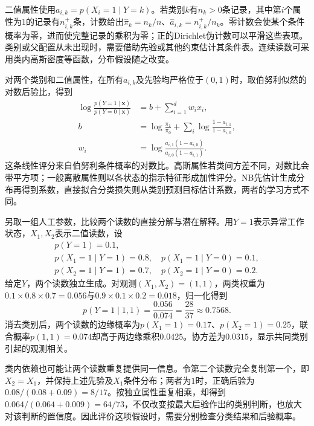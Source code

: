 二值属性使用$a_{i,k}=p(X_i=1\mid Y=k)$。若类别$k$有$n_k>0$条记录，其中第$i$个属性为$1$的记录有$n_{i,k}^{+}$条，计数给出$\widehat\pi_k=n_k/n$、$\widehat a_{i,k}=n_{i,k}^{+}/n_k$。零计数会使某个条件概率为零，进而使完整记录的乘积为零；正的Dirichlet伪计数可以平滑这些表项。类别或父配置从未出现时，需要借助先验或其他约束估计其条件表。连续读数可采用类内高斯密度等函数，分布假设随之改变。

对两个类别和二值属性，在所有$a_{i,k}$及先验均严格位于$(0,1)$时，取伯努利似然的对数后验比，得到
\begin{equation}
  \label{eq:pgm-static-directed-naive-boundary}
  \begin{aligned}
  \log\frac{p(Y=1\mid\bm{x})}{p(Y=0\mid\bm{x})}
    &=b+\sum_{i=1}^{d}w_i x_i,\\
  b&=\log\frac{\pi_1}{\pi_0}
       +\sum_i\log\frac{1-a_{i,1}}{1-a_{i,0}},\\
  w_i&=\log\frac{a_{i,1}(1-a_{i,0})}
                       {a_{i,0}(1-a_{i,1})}.
  \end{aligned}
\end{equation}
这条线性评分来自伯努利条件概率的对数比。高斯属性若类间方差不同，对数比会带平方项；一般离散属性则以各状态的指示特征形成加性评分。NB先估计生成分布再得到系数，直接拟合分类损失则从类别预测目标估计系数，两者的学习方式不同。

\begin{example}[两个二值读数]
  \label{ex:pgm-static-directed-binary}
  另取一组人工参数，比较两个读数的直接分解与潜在解释。用$Y=1$表示异常工作状态，$X_1,X_2$表示二值读数，设
  \[
  \begin{gathered}
    p(Y=1)=0.1,\\
    p(X_1=1\mid Y=1)=0.8,\quad
    p(X_1=1\mid Y=0)=0.1,\\
    p(X_2=1\mid Y=1)=0.7,\quad
    p(X_2=1\mid Y=0)=0.2.
  \end{gathered}
  \]
  给定$Y$，两个读数独立生成。对观测$(X_1,X_2)=(1,1)$，两类权重为$0.1\times0.8\times0.7=0.056$与$0.9\times0.1\times0.2=0.018$，归一化得到
  \[
    p(Y=1\mid1,1)=\frac{0.056}{0.074}
      =\frac{28}{37}\approx0.7568.
  \]
  消去类别后，两个读数的边缘概率为$p(X_1=1)=0.17$、$p(X_2=1)=0.25$，联合概率$p(1,1)=0.074$却高于两边缘乘积$0.0425$。协方差为$0.0315$，显示共同类别引起的观测相关。
\end{example}

类内依赖也可能让两个读数重复提供同一信息。令第二个读数完全复制第一个，即$X_2=X_1$，并保持上述先验及$X_1$条件分布；两者为$1$时，正确后验为$0.08/(0.08+0.09)=8/17$。按独立属性重复相乘，却得到$0.064/(0.064+0.009)=64/73$，不仅改变按最大后验作出的类别判断，也放大对该判断的置信度。因此评价这项假设时，需要分别检查分类结果和后验概率。

